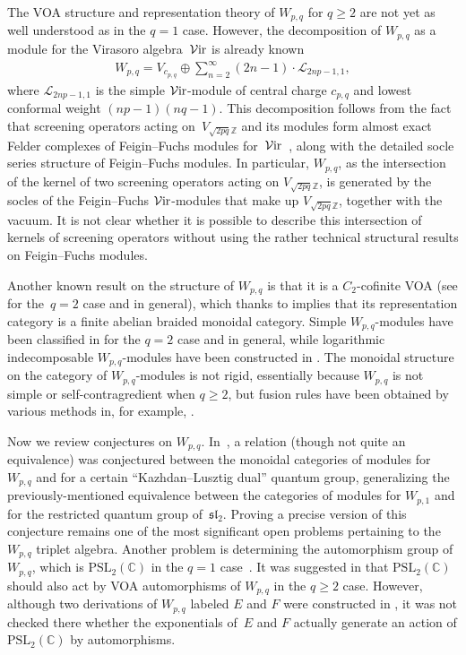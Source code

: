 \documentclass[pdftex]{sigma}
\numberwithin{equation}{section}
\theoremstyle{definition}
\begin{document}
The VOA structure and representation theory of $W_{p,q}$ for $q\geq 2$ are not yet as well understood as in the $q=1$ case. However, the decomposition of $W_{p,q}$ as a module for the Virasoro algebra~$\mathcal{V}{\rm ir}$ is already known \cite{AM-W2p-alg, AM-C2-W-alg,FGST1-Log, TW2}
\begin{gather}\label{eqn:Wpq-decomp-intro}
W_{p,q} = V_{c_{p,q}} \oplus \sum_{n=2}^\infty (2n-1)\cdot \mathcal{L}_{2np-1,1},
\end{gather}
where $\mathcal{L}_{2np-1,1}$ is the simple $\mathcal{V}{\rm ir}$-module of central charge $c_{p,q}$ and lowest conformal weight $(np-1)(nq-1)$. This decomposition follows from the fact that screening operators acting on~$V_{\sqrt{2pq}\mathbb{Z}}$ and its modules form almost exact Felder complexes \cite{Felder} of Feigin--Fuchs modules for~$\mathcal{V}{\rm ir}$~\cite{Feigin--Fuchs}, along with the detailed socle series structure of Feigin--Fuchs modules. In particular, $W_{p,q}$, as the intersection of the kernel of two screening operators acting on $V_{\sqrt{2pq}\mathbb{Z}}$, is generated by the socles of the Feigin--Fuchs $\mathcal{V}{\rm ir}$-modules that make up $V_{\sqrt{2pq}\mathbb{Z}}$, together with the vacuum. It is not clear whether it is possible to describe this intersection of kernels of screening operators without using the rather technical structural results on Feigin--Fuchs modules.


Another known result on the structure of $W_{p,q}$ is that it is a $C_2$-cofinite VOA (see \cite{AM-W2p-alg} for the~${q=2}$ case and \cite{TW2} in general), which thanks to \cite{Hu-C2} implies that its representation category is a finite abelian braided monoidal category. Simple $W_{p,q}$-modules have been classified in \cite{AM-W2p-alg-2} for the $q=2$ case and \cite{TW2} in general, while logarithmic indecomposable $W_{p,q}$-modules have been constructed in \cite{AM-Exp-log, Nak-Wpq-projective}. The monoidal structure on the category of $W_{p,q}$-modules is not rigid, essentially because $W_{p,q}$ is not simple or self-contragredient when $q\geq 2$, but fusion rules have been obtained by various methods in, for example, \cite{Nak-Wpq-fusion,Ras-Fusion, RW-Mod, Wood-Wpq-fusion}.

Now we review conjectures on $W_{p,q}$. In~\cite{FGST2-KL-dual}, a relation (though not quite an equivalence) was conjectured between the monoidal categories of modules for $W_{p,q}$ and for a certain ``Kazhdan--Lusztig dual'' quantum group, generalizing the previously-mentioned equivalence between the categories of modules for $W_{p,1}$ and for the restricted quantum group of~$\mathfrak{sl}_2$. Proving a precise version of this conjecture remains one of the most significant open problems pertaining to the~$W_{p,q}$ triplet algebra. Another problem is determining the automorphism group of $W_{p,q}$, which is $\mathrm{PSL}_2(\mathbb{C})$ in the $q=1$ case~\cite{ALM}. It was suggested in \cite{FGST1-Log} that $\mathrm{PSL}_2(\mathbb{C})$ should also act by VOA automorphisms of $W_{p,q}$ in the $q\geq 2$ case. However, although two derivations of $W_{p,q}$ labeled $E$ and $F$ were constructed in \cite{TW2}, it was not checked there whether the exponentials of~$E$ and $F$ actually generate an action of $\mathrm{PSL}_2(\mathbb{C})$ by automorphisms.
\end{document}
